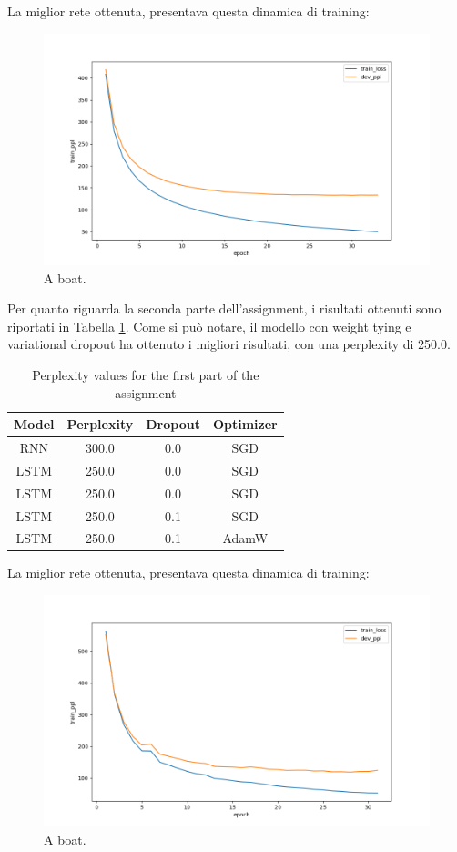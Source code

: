 \documentclass[a4paper]{article}
\begin{document}
La miglior rete ottenuta, presentava questa dinamica di training:

\begin{figure}[h!]
  \includegraphics[width=\linewidth]{./images/plot_1.png}
  \caption{A boat.}
  \label{fig:boat1}
\end{figure}


Per quanto riguarda la seconda parte dell’assignment, i risultati ottenuti sono riportati in Tabella \ref{tab:results2}. Come si può notare, il modello con weight tying e variational dropout ha ottenuto i migliori risultati, con una perplexity di 250.0.

\begin{table}[h]
  \centering
  \begin{tabular}{|c|c|c|c|}
    \hline
    \textbf{Model} & \textbf{Perplexity} & \textbf{Dropout} & \textbf{Optimizer} \\
    \hline
    RNN &  300.0 & 0.0 & SGD \\
    LSTM &  250.0 & 0.0 & SGD \\
    LSTM &  250.0 & 0.0 & SGD \\
    LSTM &  250.0 & 0.1 & SGD \\
    LSTM &  250.0 & 0.1 & AdamW \\
    \hline
  \end{tabular}
  \caption{Perplexity values for the first part of the assignment}
  \label{tab:results2}

\end{table}


La miglior rete ottenuta, presentava questa dinamica di training:
\begin{figure}[h!]
  \includegraphics[width=\linewidth]{./images/plot_2.png}
  \caption{A boat.}
  \label{fig:boat1}
\end{figure}





\end{document}
